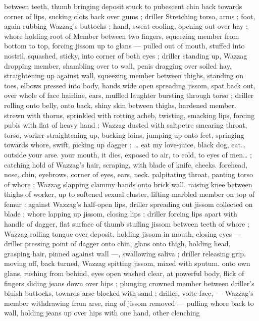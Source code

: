 {between teeth, thumb bringing deposit stuck to pubescent chin back 
towards corner of lips, sucking clots back over gums ; driller 
Stretching torso, arms ; foot, again rubbing Wazzag's buttocks ; 
hand, sweat cooling, opening out over hay ; whore holding root of 
Member between two fingers, squeezing member from bottom to top, 
forcing jissom up to glans --- pulled out of mouth, stuffed into 
nostril, squashed, sticky, into corner of both eyes ; driller standing 
up, Wazzag dropping member, shambling over to wall, penis dragging 
over soiled hay, straightening up against wall, squeezing member 
between thighs, standing on toes, elbows pressed into body, hands 
wide open spreading jissom, spat back out, over whole of face 
hairline, ears, muffled laughter bursting through torso ; driller rolling 
onto belly, onto back, shiny skin between thighs, hardened member. 
strewn with thorns, sprinkled with rotting acheb, twisting, smacking 
lips, forcing pubis with flat of heavy hand ; Wazzag dusted with 
saltpetre smearing throat, torso, worker straightening up, bucking 
loins, jumping up onto feet, springing towards whore, swift, picking 
up dagger : {\gl}{\ldots} eat my love-juice, black dog, eat{\ldots} outside your arse. 
your mouth, it dies, exposed to air, to cold, to eyes of men{\ldots}{\gr} ; 
catching hold of Wazzag's hair, scraping, with blade of knife, cheeks. 
forehead, nose, chin, eyebrows, corner of eyes, ears, neck. 
palpitating throat, panting torso of whore ; Wazzag slapping clammy 
hands onto brick wall, raising knee between thighs of worker, up to 
softened sexual cluster, lifting marbled member on top of femur : 
against Wazzag's half-open lips, driller spreading out jissom 
collected on blade ; whore lapping up jissom, closing lips ; driller 
forcing lips apart with handle of dagger, flat surface of thumb 
stuffing jissom between teeth of whore ; Wazzag rolling tongue over 
deposit, holding jissom in mouth, closing eyes --- driller pressing 
point of dagger onto chin, glans onto thigh, holding head, grasping 
hair, pinned against wall ---, swallowing saliva ; driller releasing grip. 
moving off, back turned, Wazzag spitting jissom, mixed with sputum. 
onto own glans, rushing from behind, eyes open washed clear, at 
powerful body, flick of fingers sliding jeans down over hips ; plunging 
crowned member between driller's bluish buttocks, towards arse 
blocked with sand ; driller, volte-face, --- Wazzag's member 
withdrawing from arse, ring of jissom removed --- pulling whore back 
to wall, holding jeans up over hips with one hand, other clenching 
}
